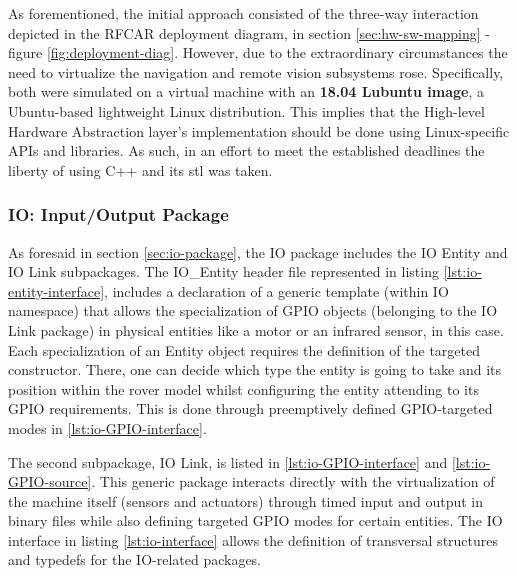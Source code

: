 As forementioned, the initial approach consisted of the three-way interaction depicted in the RFCAR deployment diagram, in section \ref{sec:hw-sw-mapping} - figure \ref{fig:deployment-diag}. However, due to the extraordinary circumstances the need to virtualize the navigation and remote vision subsystems rose. Specifically, both were simulated on a virtual machine with an \textbf{18.04 Lubuntu image}, a Ubuntu-based lightweight Linux distribution. This implies that the High-level Hardware Abstraction layer's implementation should be done using Linux-specific APIs and libraries. As such, in an effort to meet the established deadlines the liberty of using C++ and its \gls{stl} was taken. 
%
\subsubsection{IO: Input/Output Package}
As foresaid in section \ref{sec:io-package}, the IO package includes the IO Entity and IO Link subpackages. The IO\_Entity header file represented in listing \ref{lst:io-entity-interface}, includes a declaration of a generic template (within IO namespace) that allows the specialization of GPIO objects (belonging to the IO Link package) in physical entities like a motor or an infrared sensor, in this case. Each specialization of an Entity object requires the definition of the targeted constructor. There, one can decide which type the entity is going to take and its position within the rover model whilst configuring the entity attending to its GPIO requirements. This is done through preemptively defined GPIO-targeted modes in \ref{lst:io-GPIO-interface}.\par
%
The second subpackage, IO Link, is listed in \ref{lst:io-GPIO-interface} and \ref{lst:io-GPIO-source}. This generic package interacts directly with the virtualization of the machine itself (sensors and actuators) through timed input and output in binary files while also defining targeted GPIO modes for certain entities. The IO interface in listing \ref{lst:io-interface} allows the definition of transversal structures and typedefs for the IO-related packages.
%

%

%

%

%
%
